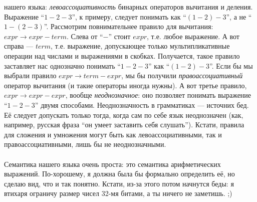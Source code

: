 \documentclass[11pt]{book}
\begin{document}
нашего языка: \emph{левоассоциативность} бинарных операторов вычитания и деления.
Выражение ``$1 - 2 - 3$'', к примеру, следует понимать как ``$(1 - 2) - 3$'', а не ``$1 - (2 - 3)$''.
Рассмотрим повнимательнее правило для вычитания: $expr \rightarrow expr - term$.
Слева от ``$-$'' стоит $expr$, т.е. любое выражение. А вот справа --- $term$,
т.е. выражение, допускающее только мультипликативные операции над числами и выражениями в скобках.
Получается, такое правило заставляет нас однозначно понимать ``$1 - 2 - 3$'' как ``$(1 - 2) - 3$''.
Если бы мы выбрали правило $expr \rightarrow term - expr$, мы бы получили \emph{правоассоциативный}
оператор вычитания (и такие операторы иногда нужны). А вот третье правило, $expr \rightarrow expr - expr$,
вообще \emph{неоднозначное}: оно позволяет понимать выражение ``$1 - 2 - 3$''
двумя способами. Неоднозначность в грамматиках --- источних бед. Её следует допускать только тогда, когда
сам по себе язык неоднозначен (как, например, русская фраза ``он умеет заставить себя слушать'').
Кстати, правила для сложения и умножения могут быть как левоассоциативными, так и правоассоциативными, лишь бы не неоднозначными.
\\ \\
Семантика нашего языка очень проста: это семантика арифметических выражений.
По-хорошему, я должна была бы формально определить её, но сделаю вид, что и так понятно.
Кстати, из-за этого потом начнутся беды: я втихаря ограничу размер чисел 32-мя битами, а ты ничего не заметишь. ;)
\end{document}

